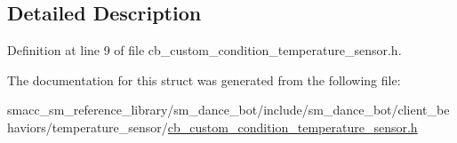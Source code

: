 \subsection{Detailed Description}


Definition at line 9 of file cb\+\_\+custom\+\_\+condition\+\_\+temperature\+\_\+sensor.\+h.



The documentation for this struct was generated from the following file\+:\begin{DoxyCompactItemize}
\item 
smacc\+\_\+sm\+\_\+reference\+\_\+library/sm\+\_\+dance\+\_\+bot/include/sm\+\_\+dance\+\_\+bot/client\+\_\+behaviors/temperature\+\_\+sensor/\hyperlink{cb__custom__condition__temperature__sensor_8h}{cb\+\_\+custom\+\_\+condition\+\_\+temperature\+\_\+sensor.\+h}\end{DoxyCompactItemize}
